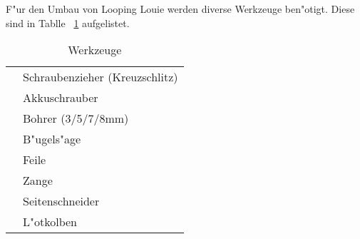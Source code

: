 
F"ur den Umbau von Looping Louie werden diverse Werkzeuge ben"otigt. Diese sind in Tablle ~\ref{table:tools} aufgelistet.

\vspace{1cm}
\begin{table}[ht]
	\centering

	\begin{tabular}{ c p{8cm} } 
		\hline \hline
			& Schraubenzieher (Kreuzschlitz) \\
			& Akkuschrauber                  \\
			& Bohrer (3/5/7/8mm)             \\
			& B"ugels"age                    \\
			& Feile                          \\
			& Zange                          \\
			& Seitenschneider                \\
			& L"otkolben                     \\
		\hline \hline
	\end{tabular}

	\caption{Werkzeuge}
	\label{table:tools}
\end{table}
\vspace{0.5cm}
